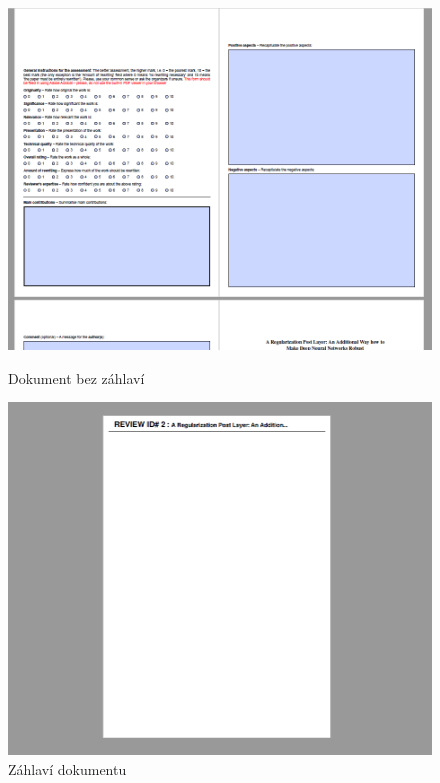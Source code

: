 \documentclass[czech,BP]{thesiskiv}
\begin{document}
\begin{figure}[h]
    \centering
    \begin{minipage}[b]{0.4\textwidth}
    	\includegraphics[width=\textwidth]{obr5.png}
    	\caption{Dokument bez záhlaví}
    	\label{withoutHeader}
    \end{minipage}
    \hfill
    \begin{minipage}[b]{0.4\textwidth}
    	\includegraphics[width=\textwidth]{obr6.png}
    	\caption{Záhlaví dokumentu}
    	\label{header}
    \end{minipage}
\end{figure}
\end{document}
